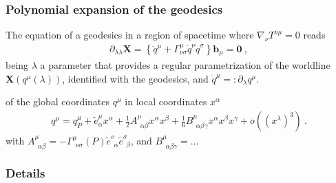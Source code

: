 \documentclass[letterpaper,10pt,english]{jupyterBook}
\begin{document}
\subsubsection{Polynomial expansion of the geodesics}
\label{\detokenize{ch/relativity-general/local-inertial-reference-frame-and-equivalence-principle:polynomial-expansion-of-the-geodesics}}
\sphinxAtStartPar
The equation of a geodesics in a region of spacetime where \(\nabla_{\nu} T^{\nu \mu } = 0\) reads
\begin{equation*}
\begin{split}\partial_{\lambda \lambda} \mathbf{X} = \left\{ \ddot{q}^{\mu} + \Gamma^{\mu}_{\nu \sigma} \dot{q}^{\nu} \dot{q}^{\sigma}  \right\} \mathbf{b}_{\mu} = \mathbf{0} \ ,\end{split}
\end{equation*}
\sphinxAtStartPar
being \(\lambda\) a parameter that provides a regular parametrization of the worldline \(\mathbf{X}\left( q^{\mu} ( \lambda ) \right)\), identified with the geodesics, and \(\dot{q}^{\mu} =: \partial_\lambda q^{\mu}\).

\sphinxAtStartPar
{} of the global coordinates \(q^{\mu}\) in local coordinates \(x^{\alpha}\)
\begin{equation}\label{equation:ch/relativity-general/local-inertial-reference-frame-and-equivalence-principle:eq-polynomial-expansion}
\begin{split}q^{\mu} = q^{\mu}_P + \widetilde{e}^{\mu}_{\alpha} x^{\alpha} + \frac{1}{2} A^{\mu}_{\ \ \alpha \beta} x^\alpha x^\beta + \frac{1}{6} B^{\mu}_{\ \ \alpha \beta \gamma} x^{\alpha} x^{\beta} x^\gamma + o\left( \left( x^\lambda \right)^3 \right) \ .\end{split}
\end{equation}
\sphinxAtStartPar
with \(A^{\mu}_{\ \ \alpha \beta} = - \Gamma^{\mu}_{\ \ \nu \sigma}(P) \widetilde{e}^{\nu}_{\ \ \alpha} \widetilde{e}^{\sigma}_{\ \ \beta}\), and \(B^{\mu}_{\ \ \alpha \beta \gamma} = \dots\)
\subsubsection*{Details}
\end{document}
